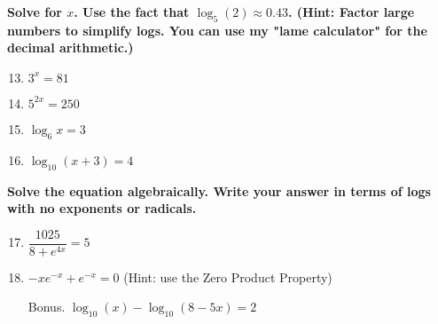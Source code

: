 \documentclass[letterpaper]{article}
\begin{document}
\noindent	\textbf{Solve for $x$. Use the fact that $\log_5(2)\approx 0.43$. (Hint: Factor large numbers to simplify logs. You can use my "lame calculator" for the decimal arithmetic.)}
\begin{enumerate}\setcounter{enumi}{12}
\item $3^x = 81$
\item $5^{2x}=250$ 
\item $\log_6 x=3$
\item $\log_{10}(x+3)=4$
\end{enumerate}
\noindent	\textbf{Solve the equation algebraically. Write your answer in terms of logs with no exponents or radicals.}
\begin{enumerate}\setcounter{enumi}{16}
\item $\dfrac{1025}{8+e^{4x}}=5$
\item $-xe^{-x}+e^{-x}=0$ \quad (Hint: use the Zero Product Property)
\item[Bonus.] $\log_{10}(x)-\log_{10}(8-5x)=2$
\end{enumerate}
\end{document}
